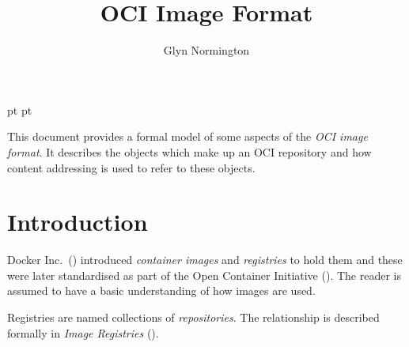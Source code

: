 \documentclass[a4paper,twoside,12pt]{article}
\begin{document}
 pt
 pt

\def\Slash{\slash\hspace{0pt}}

\title{OCI Image Format}

\author{Glyn Normington}

\maketitle
\thispagestyle{empty}
\setcounter{page}{1}


This document provides a formal model of some aspects of the \textit{OCI image format}. It describes the objects which make
up an OCI repository and how content addressing is used to refer to these objects.



\newcommand{\true}{true}
\newcommand{\false}{false}
\renewcommand{\emptyset}{\varnothing}

\clearpage
\tableofcontents

\cleardoublepage
{}
\setcounter{page}{1}

\section{Introduction}

Docker Inc.\ (\cite{docker}) introduced \textit{container images} and \textit{registries} to hold them and these were later standardised as part of the Open Container Initiative (\cite{oci}). The reader is assumed to have a basic understanding of how images are used.

Registries are named collections of \textit{repositories}. The relationship is described formally in \textit{Image Registries} (\cite{registries}).
\end{document}

